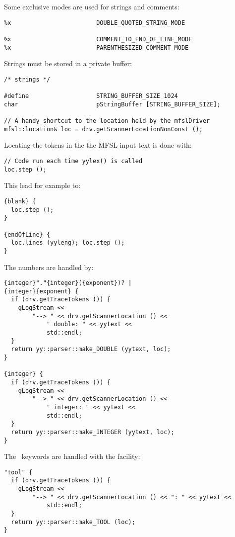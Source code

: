 Some exclusive modes are used for strings and comments:
\begin{lstlisting}[language=Flex]
%x                        SINGLE_QUOTED_STRING_MODE
%x                        DOUBLE_QUOTED_STRING_MODE

%x                        COMMENT_TO_END_OF_LINE_MODE
%x                        PARENTHESIZED_COMMENT_MODE
\end{lstlisting}

Strings must be stored in a private buffer:
\begin{lstlisting}[language=Flex]
/* strings */

#define                   STRING_BUFFER_SIZE 1024
char                      pStringBuffer [STRING_BUFFER_SIZE];

// A handy shortcut to the location held by the mfslDriver
mfsl::location& loc = drv.getScannerLocationNonConst ();
\end{lstlisting}

Locating the tokens in the the MFSL input text is done with:
\begin{lstlisting}[language=Flex]
// Code run each time yylex() is called
loc.step ();
\end{lstlisting}

This lead for example to:
\begin{lstlisting}[language=Flex]
{blank} {
  loc.step ();
}

{endOfLine} {
  loc.lines (yyleng); loc.step ();
}
\end{lstlisting}

The numbers are handled by:
\begin{lstlisting}[language=Flex]
{integer}"."{integer}({exponent})? |
{integer}{exponent} {
  if (drv.getTraceTokens ()) {
    gLogStream <<
    	"--> " << drv.getScannerLocation () <<
			" double: " << yytext <<
			std::endl;
  }
  return yy::parser::make_DOUBLE (yytext, loc);
}

{integer} {
  if (drv.getTraceTokens ()) {
    gLogStream <<
    	"--> " << drv.getScannerLocation () <<
			" integer: " << yytext <<
			std::endl;
  }
  return yy::parser::make_INTEGER (yytext, loc);
}
\end{lstlisting}

The \mfslLang\ keywords are handled with the  facility:
\begin{lstlisting}[language=Flex]
"tool" {
  if (drv.getTraceTokens ()) {
    gLogStream <<
    	"--> " << drv.getScannerLocation () << ": " << yytext <<
			std::endl;
  }
  return yy::parser::make_TOOL (loc);
}
\end{lstlisting}


